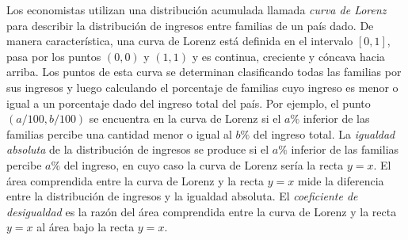 \item Los economistas utilizan una distribución acumulada llamada \textit{curva de Lorenz} para describir la distribución de ingresos entre familias de un país dado. De manera característica, una curva de Lorenz está definida en el intervalo $[0, 1]$, pasa por los puntos $(0, 0)$ y $(1, 1)$ y es continua, creciente y cóncava hacia arriba. Los puntos de esta curva se determinan clasificando todas las familias por sus ingresos y luego calculando el porcentaje de familias cuyo ingreso es menor o igual a un porcentaje dado del ingreso total del país. Por ejemplo, el punto $(a/100, b/100)$ se encuentra en la curva de Lorenz si el $a\%$ inferior de las familias percibe una cantidad menor o igual al $b\%$ del ingreso total. La \textit{igualdad absoluta} de la distribución de ingresos se produce si el $a\%$ inferior de las familias percibe $a\%$ del ingreso, en cuyo caso la curva de Lorenz sería la recta $y = x$. El área comprendida entre la curva de Lorenz y la recta $y = x$ mide la diferencia entre la distribución de ingresos y la igualdad absoluta. El \textit{coeficiente de desigualdad} es la razón del área comprendida entre la curva de Lorenz y la recta $y = x$ al área bajo la recta $y = x$.
    
    \begin{center}
    \end{center}
    
